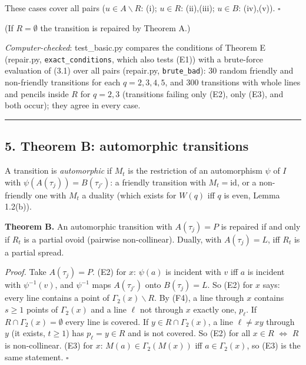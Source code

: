 \documentclass[
  11pt,
]{article}
\begin{document}
These cases cover all pairs (\(u\in A\smallsetminus R\): (i);
\(u\in R\): (ii),(iii); \(u\in B\): (iv),(v)). \(\square\)

(If \(R = \emptyset\) the transition is repaired by Theorem A.)

\emph{Computer-checked}: test\_basic.py compares the conditions of
Theorem E (repair.py, \texttt{exact\_conditions}, which also tests (E1))
with a brute-force evaluation of (3.1) over all pairs (repair.py,
\texttt{brute\_bad}): 30 random friendly and non-friendly transitions
for each \(q = 2,3,4,5\), and 300 transitions with whole lines and
pencils inside \(R\) for \(q = 2,3\) (transitions failing only (E2),
only (E3), and both occur); they agree in every case.

\begin{center}\rule{0.5\linewidth}{0.5pt}\end{center}

\hypertarget{theorem-b-automorphic-transitions}{%
\subsection{5. Theorem B: automorphic
transitions}\label{theorem-b-automorphic-transitions}}

A transition is \emph{automorphic} if \(M_t\) is the restriction of an
automorphism \(\psi\) of \(I\) with \(\psi(A(\tau_j)) = B(\tau_{j'})\):
a friendly transition with \(M_t = \mathrm{id}\), or a non-friendly one
with \(M_t\) a duality (which exists for \(W(q)\) iff \(q\) is even,
Lemma 1.2(b)).

\textbf{Theorem B.} An automorphic transition with \(A(\tau_j) = P\) is
repaired if and only if \(R_t\) is a partial ovoid (pairwise
non-collinear). Dually, with \(A(\tau_j) = L\), iff \(R_t\) is a partial
spread.

\emph{Proof.} Take \(A(\tau_j) = P\). (E2) for \(x\): \(\psi(a)\) is
incident with \(v\) iff \(a\) is incident with \(\psi^{-1}(v)\), and
\(\psi^{-1}\) maps \(A(\tau_{j'})\) onto \(B(\tau_j) = L\). So (E2) for
\(x\) says: every line contains a point of
\(\Gamma_2(x)\smallsetminus R\). By (F4), a line through \(x\) contains
\(s\ge 1\) points of \(\Gamma_2(x)\) and a line \(\ell\) not through
\(x\) exactly one, \(p_\ell\). If \(R\cap\Gamma_2(x) = \emptyset\) every
line is covered. If \(y\in R\cap\Gamma_2(x)\), a line \(\ell\ne xy\)
through \(y\) (it exists, \(t\ge 1\)) has \(p_\ell = y\in R\) and is not
covered. So (E2) for all \(x\in R\) \(\iff\) \(R\) is non-collinear.
(E3) for \(x\): \(M(a)\in\Gamma_2(M(x))\) iff \(a\in\Gamma_2(x)\), so
(E3) is the same statement. \(\square\)
\end{document}
